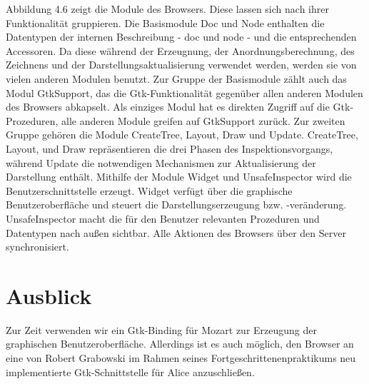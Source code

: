 \documentclass[12pt,a4paper]{article}
\begin{document}
Abbildung 4.6 zeigt die Module des Browsers. 
Diese lassen sich nach ihrer Funktionalit\"at gruppieren.
\newline
Die Basismodule Doc und Node enthalten die Datentypen
der internen Beschreibung - doc und node - und die
entsprechenden Accessoren. Da diese w\"{a}hrend der 
Erzeugnung, der Anordnungsberechnung, des Zeichnens 
und der Darstellungsaktualisierung verwendet werden, 
werden sie von vielen anderen Modulen benutzt. Zur Gruppe 
der Basismodule z\"ahlt auch das Modul GtkSupport, das die
Gtk-Funktionalit\"at gegen\"uber allen anderen Modulen des 
Browsers abkapselt. Als einziges Modul hat es direkten Zugriff 
auf die Gtk-Prozeduren, alle anderen Module greifen auf 
GtkSupport zur\"uck. \newline \hspace*{5mm}
Zur zweiten Gruppe geh\"oren die Module CreateTree, Layout, Draw 
und Update. CreateTree, Layout, und Draw repr\"{a}sentieren 
die drei Phasen des Inspektionsvorgangs, w\"ahrend  Update die 
notwendigen Mechanismen zur Aktualisierung der Darstellung
enth\"alt. \newline \hspace*{5mm}
Mithilfe der Module Widget und UnsafeInspector wird die 
Benutzerschnittstelle erzeugt. Widget verf\"ugt \"uber die 
graphische Benutzeroberfl\"ache und steuert die 
Darstellungserzeugung bzw. -ver\"anderung. UnsafeInspector macht 
die f\"ur den Benutzer relevanten Prozeduren und Datentypen nach 
au\ss en sichtbar. \newline \hspace*{5mm}
Alle Aktionen des Browsers \"uber den Server synchronisiert.



\section{Ausblick}

Zur Zeit verwenden wir ein Gtk-Binding f\"ur Mozart \cite{mo:mo}
zur Erzeugung der graphischen Benutzeroberfl\"ache. Allerdings ist 
es auch m\"oglich, den Browser an eine von Robert Grabowski im Rahmen 
seines Fortgeschrittenenpraktikums neu implementierte Gtk-Schnittstelle
f\"ur Alice \cite{gr:gt} anzuschlie\ss en.

\paragraph{}
\end{document}
